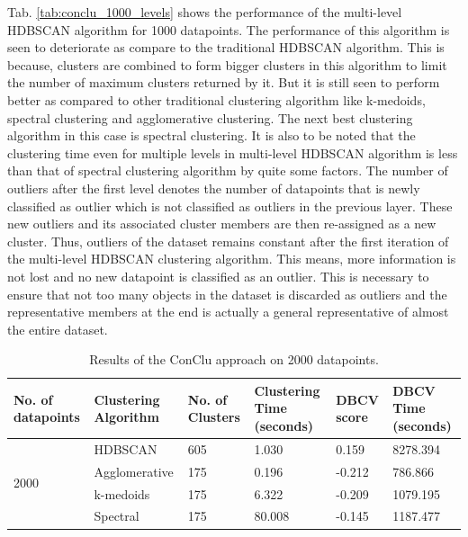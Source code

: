  Tab. \ref{tab:conclu_1000_levels} shows the performance of the multi-level \ac{HDBSCAN} algorithm for 1000 datapoints. The performance of this algorithm is seen to deteriorate as compare to the traditional \ac{HDBSCAN} algorithm. This is because, clusters are combined to form bigger clusters in this algorithm to limit the number of maximum clusters returned by it. But it is still seen to perform better as compared to other traditional clustering algorithm like k-medoids, spectral clustering and agglomerative clustering. The next best clustering algorithm in this case is spectral clustering. It is also to be noted that the clustering time even for multiple levels in multi-level \ac{HDBSCAN} algorithm is less than that of spectral clustering algorithm by quite some factors. The number of outliers after the first level denotes the number of datapoints that is newly classified as outlier which is not classified as outliers in the previous layer. These new outliers and its associated cluster members are then re-assigned as a new cluster. Thus, outliers of the dataset remains constant after the first iteration of the multi-level \ac{HDBSCAN} clustering algorithm. This means, more information is not lost and no new datapoint is classified as an outlier. This is necessary to ensure that not too many objects in the dataset is discarded as outliers and the representative members at the end is actually a general representative of almost the entire dataset. 

\begin{table}[H]
  \setlength\extrarowheight{10pt}
  \caption{Results of the ConClu approach on 2000 datapoints. }
  \centering
  \begin{tabular}{|p{50pt}|p{60pt}|p{50pt}|p{40pt}|p{50pt}|p{40pt}|}
    \toprule
    No. of datapoints & Clustering Algorithm & No. of Clusters & Clustering Time (seconds) & \ac{DBCV} score & \ac{DBCV} Time (seconds)\\
    \midrule
    \multirow{4}{1.0in}{2000} & \ac{HDBSCAN}	& 605	& 1.030 & 0.159	& 8278.394 \\ \cline{2-6} 
                              & Agglomerative	& 175	& 0.196 & -0.212	& 786.866 \\ \cline{2-6} 
                              & k-medoids	& 175	& 6.322 & -0.209	& 1079.195 \\ \cline{2-6}
                              & Spectral	& 175	& 80.008 & -0.145	& 1187.477 \\ 
    \bottomrule
  \end{tabular}
  \label{tab:conclu_2000}
\end{table}

